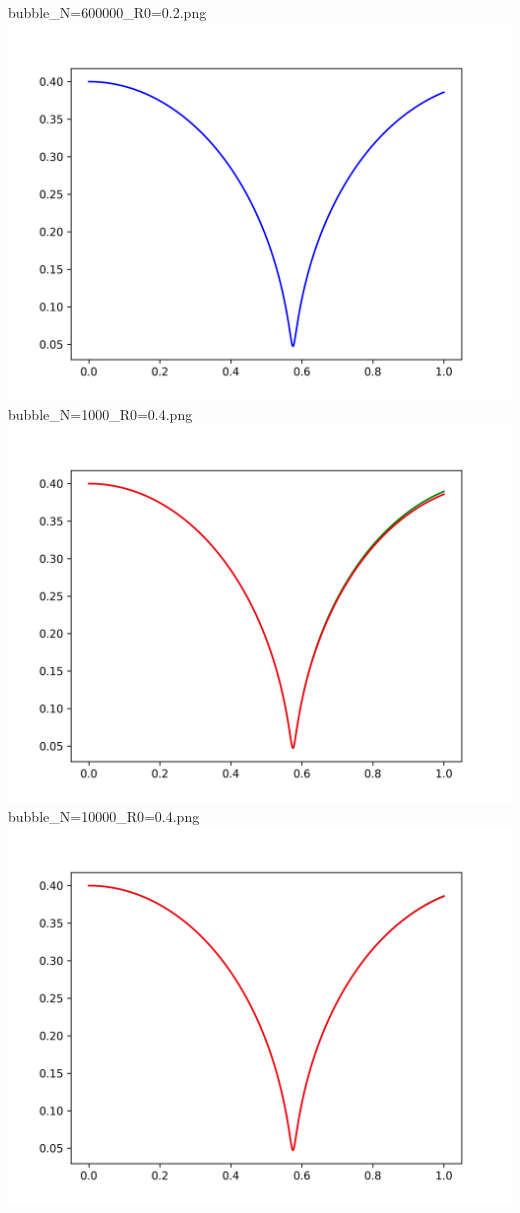 \documentclass[a4paper,14pt]{article}
\begin{document}
bubble\_N=600000\_R0=0.2.png\newline
%
\includegraphics[scale=0.5]{images/graphs/bubble_N=1000_R0=0.4.png}\newline
bubble\_N=1000\_R0=0.4.png\newline
\includegraphics[scale=0.5]{images/graphs/bubble_N=10000_R0=0.4.png}\newline
bubble\_N=10000\_R0=0.4.png\newline
\includegraphics[scale=0.5]{images/graphs/bubble_N=100000_R0=0.4.png}\newline
\end{document}
